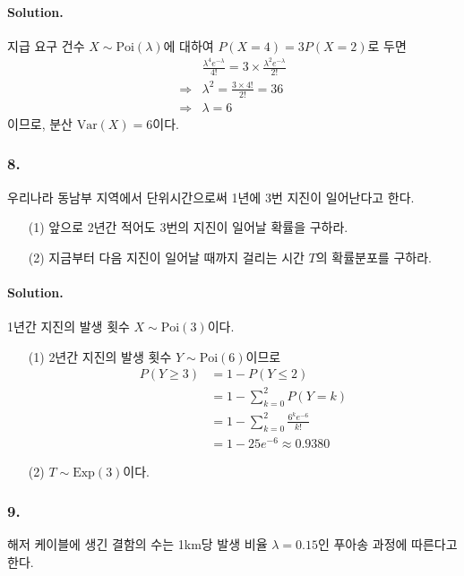 \paragraph{Solution.} 지급 요구 건수 $X \sim \mathrm{Poi}\left(\lambda\right)$에 대하여 $P\left(X=4\right)=3P\left(X=2\right)$로 두면
\begin{align*}
	 &\frac{\lambda^4 e^{-\lambda}}{4!} = 3\times \frac{\lambda^2 e^{-\lambda}}{2!} \\
	\Rightarrow& \lambda^2 = \frac{3\times 4!}{2!} = 36 \\
	\Rightarrow& \lambda = 6
\end{align*}
이므로, 분산 $\mathrm{Var}\left(X\right) = 6$이다.

\subsubsection{8.} 우리나라 동남부 지역에서 단위시간으로써 1년에 3번 지진이 일어난다고 한다.

\begin{itemize}
	\item [(1)] 앞으로 2년간 적어도 3번의 지진이 일어날 확률을 구하라.
	\item [(2)] 지금부터 다음 지진이 일어날 때까지 걸리는 시간 $T$의 확률분포를 구하라.
\end{itemize}

\paragraph{Solution.} 1년간 지진의 발생 횟수 $X \sim \mathrm{Poi}\left(3\right)$이다.

\begin{itemize}
	\item [(1)] {
		2년간 지진의 발생 횟수 $Y \sim \mathrm{Poi}\left(6\right)$이므로
		\begin{align*}
			P\left(Y\geq3\right) &= 1 - P\left(Y\leq2\right) \\
			&= 1 - \sum_{k=0}^2 P\left(Y=k\right) \\
			&= 1 - \sum_{k=0}^2 \frac{6^k e^{-6}}{k!} \\ 
			&= 1 - 25e^{-6} \approx 0.9380
		\end{align*}
	}
	\item [(2)] {
		$T \sim \mathrm{Exp}\left(3\right)$이다.
	}
\end{itemize}

\subsubsection{9.} 해저 케이블에 생긴 결함의 수는 1km당 발생 비율 $\lambda = 0.15$인 푸아송 과정에 따른다고 한다.

